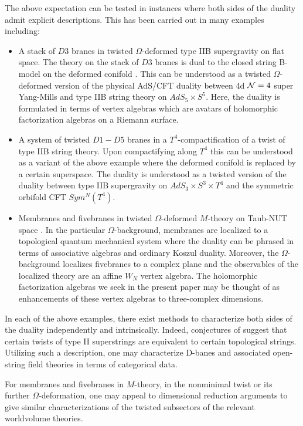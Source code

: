 The above expectation can be tested in instances where both sides of the duality admit explicit descriptions.
This has been carried out in many examples including:
\begin{itemize}
  \item A stack of $D3$ branes in twisted $\Omega$-deformed type IIB supergravity on flat space. The theory on the stack of $D3$ branes is dual to the closed string B-model on the deformed conifold \cite{CostelloGaiotto}. This can be understood as a twisted $\Omega$-deformed version of the physical AdS/CFT duality between 4d $\mathcal N=4$ super Yang-Mills and type IIB string theory on $AdS_{5}\times S^{5}$. Here, the duality is formulated in terms of vertex algebras which are avatars of holomorphic factorization algebras on a Riemann surface.

  \item A system of twisted $D1-D5$ branes in a $T^{4}$-compactification of a twist of type IIB string theory. Upon compactifying along $T^4$ this can be understood as a variant of the above example where the deformed conifold is replaced by a certain superspace. The duality is understood as a twisted version of the duality between type IIB supergravity on $AdS_{3}\times S^{3}\times T^{4}$ and the symmetric orbifold CFT $Sym^{N}(T^{4})$.

  \item Membranes and fivebranes in twisted $\Omega$-deformed $M$-theory on Taub-NUT space \cite{CostelloM5,CostelloM2}.
In the particular $\Omega$-background, membranes are localized to a topological quantum mechanical system where the duality can be phrased in terms of associative algebras and ordinary Koszul duality. Moreover, the $\Omega$-background localizes fivebranes to a complex plane and the observables of the localized theory are an affine $W_{N}$ vertex algebra. The holomorphic factorization algebras we seek in the present paper may be thought of as enhancements of these vertex algebras to three-complex dimensions.
\end{itemize}

In each of the above examples, there exist methods to characterize both sides of the duality independently and intrinsically. Indeed, conjectures of \cite{CLSugra} suggest that certain twists of type II superstrings are equivalent to certain topological strings. Utilizing such a description, one may characterize D-banes and associated open-string field theories in terms of categorical data.

For membranes and fivebranes in $M$-theory, in the nonminimal twist or its further $\Omega$-deformation, one may appeal to dimensional reduction arguments to give similar characterizations of the twisted subsectors of the relevant worldvolume theories.

